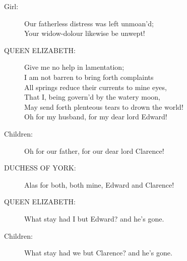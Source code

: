\documentclass{article}
\begin{document}
\begin{description}
\item[Girl:] 
\hspace{1pt}Our fatherless distress was left unmoan'd;\\
\hspace{1pt}Your widow-dolour likewise be unwept!\\
\end{description}
\begin{description}
\item[QUEEN ELIZABETH:] 
\hspace{1pt}Give me no help in lamentation;\\
\hspace{1pt}I am not barren to bring forth complaints\\
\hspace{1pt}All springs reduce their currents to mine eyes,\\
\hspace{1pt}That I, being govern'd by the watery moon,\\
\hspace{1pt}May send forth plenteous tears to drown the world!\\
\hspace{1pt}Oh for my husband, for my dear lord Edward!\\
\end{description}
\begin{description}
\item[Children:] 
\hspace{1pt}Oh for our father, for our dear lord Clarence!\\
\end{description}
\begin{description}
\item[DUCHESS OF YORK:] 
\hspace{1pt}Alas for both, both mine, Edward and Clarence!\\
\end{description}
\begin{description}
\item[QUEEN ELIZABETH:] 
\hspace{1pt}What stay had I but Edward? and he's gone.\\
\end{description}
\begin{description}
\item[Children:] 
\hspace{1pt}What stay had we but Clarence? and he's gone.\\
\end{description}
\end{document}
